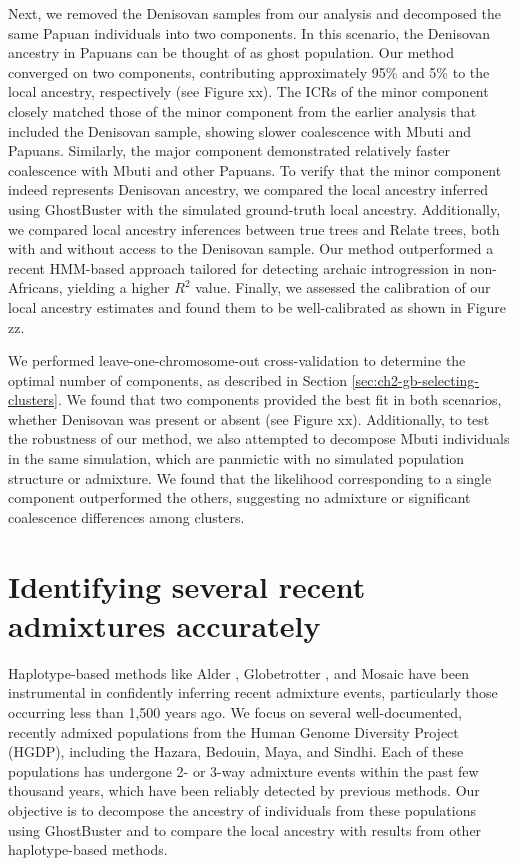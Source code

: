 Next, we removed the Denisovan samples from our analysis and decomposed the same Papuan individuals into two components. In this scenario, the Denisovan ancestry in Papuans can be thought of as ghost population. Our method converged on two components, contributing approximately 95\% and 5\% to the local ancestry, respectively (see Figure xx). The ICRs of the minor component closely matched those of the minor component from the earlier analysis that included the Denisovan sample, showing slower coalescence with Mbuti and Papuans. Similarly, the major component demonstrated relatively faster coalescence with Mbuti and other Papuans. To verify that the minor component indeed represents Denisovan ancestry, we compared the local ancestry inferred using GhostBuster with the simulated ground-truth local ancestry. Additionally, we compared local ancestry inferences between true trees and Relate trees, both with and without access to the Denisovan sample. Our method outperformed a recent HMM-based approach tailored for detecting archaic introgression in non-Africans, yielding a higher $R^2$ value. Finally, we assessed the calibration of our local ancestry estimates and found them to be well-calibrated as shown in Figure zz.

We performed leave-one-chromosome-out cross-validation to determine the optimal number of components, as described in Section \ref{sec:ch2-gb-selecting-clusters}. We found that two components provided the best fit in both scenarios, whether Denisovan was present or absent (see Figure xx). Additionally, to test the robustness of our method, we also attempted to decompose Mbuti individuals in the same simulation, which are panmictic with no simulated population structure or admixture. We found that the likelihood corresponding to a single component outperformed the others, suggesting no admixture or significant coalescence differences among clusters.

\section{Identifying several recent admixtures accurately}
\label{sec:ch2-gb-real}

Haplotype-based methods like Alder \cite{loh2013inferring}, Globetrotter \cite{hellenthal2014genetic}, and Mosaic \cite{salter2019fine} have been instrumental in confidently inferring recent admixture events, particularly those occurring less than 1,500 years ago. We focus on several well-documented, recently admixed populations from the Human Genome Diversity Project (HGDP), including the Hazara, Bedouin, Maya, and Sindhi. Each of these populations has undergone 2- or 3-way admixture events within the past few thousand years, which have been reliably detected by previous methods. Our objective is to decompose the ancestry of individuals from these populations using GhostBuster and to compare the local ancestry with results from other haplotype-based methods.

